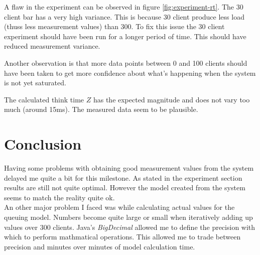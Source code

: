 \documentclass[a4paper]{article}
\begin{document}
A flaw in the experiment can be observed in figure \ref{fig:experiment-rt}. The 30 client bar has a very high variance. This is because 30 client produce less load (thuss less measurement values) than 300. To fix this issue the 30 client experiment should have been run for a longer period of time. This should have reduced measurement variance.

Another observation is that more data points between 0 and 100 clients should have been taken to get more confidence about what's happening when the system is not yet saturated.

The calculated think time $Z$ has the expected magnitude and does not vary too much (around 15ms). The measured data seem to be plausible.


\pagebreak
\section{Conclusion}

Having some problems with obtaining good measurement values from the system delayed me quite a bit for this milestone. As stated in the experiment section results are still not quite optimal. However the model created from the system seems to match the reality quite ok.\\

An other major problem I faced was while calculating actual values for the queuing model. Numbers become quite large or small when iteratively adding up values over 300 clients. Java's \textit{BigDecimal} allowed me to define the precision with which to perform mathmatical operations. This allowed me to trade between precision and minutes over minutes of model calculation time.




\end{document}
